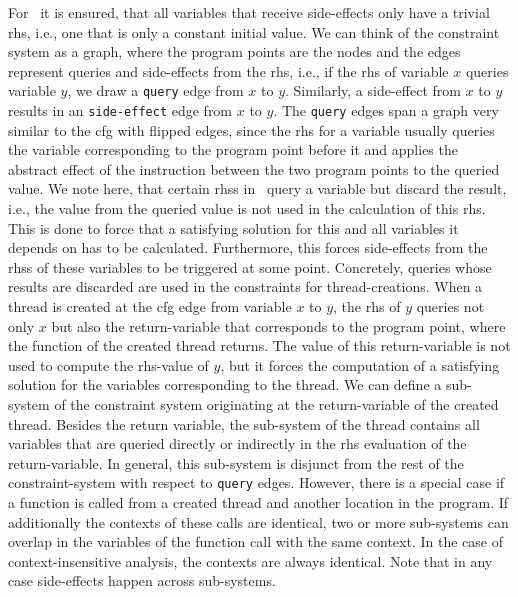   For \gob\ it is ensured, that all variables that receive side-effects only have a trivial \ac{rhs}, i.e., one that is only a constant initial value.
  We can think of the constraint system as a graph, where the program points are the nodes and the edges represent queries and side-effects from the \ac{rhs}, i.e., if the \ac{rhs} of variable $x$ queries variable $y$, we draw a \texttt{query} edge from $x$ to $y$. Similarly, a side-effect from $x$ to $y$ results in an \texttt{side-effect} edge from $x$ to $y$. The \texttt{query} edges span a graph very similar to the \ac{cfg} with flipped edges, since the \ac{rhs} for a variable usually queries the variable corresponding to the program point before it and applies the abstract effect of the instruction between the two program points to the queried value.
  We note here, that certain \acp{rhs} in \gob\ query a variable but discard the result, i.e., the value from the queried value is not used in the calculation of this \ac{rhs}. This is done to force that a satisfying solution for this and all variables it depends on has to be calculated. Furthermore, this forces side-effects from the \acp{rhs} of these variables to be triggered at some point. Concretely, queries whose results are discarded are used in the constraints for thread-creations. When a thread is created at the \ac{cfg} edge from variable $x$ to $y$, the \ac{rhs} of $y$ queries not only $x$ but also the return-variable that corresponds to the program point, where the function of the created thread returns. The value of this return-variable is not used to compute the \ac{rhs}-value of $y$, but it forces the computation of a satisfying solution for the variables corresponding to the thread.
  We can define a sub-system of the constraint system originating at the return-variable of the created thread. Besides the return variable, the sub-system of the thread contains all variables that are queried directly or indirectly in the \ac{rhs} evaluation of the return-variable. In general, this sub-system is disjunct from the rest of the constraint-system with respect to \texttt{query} edges. However, there is a special case if a function is called from a created thread and another location in the program. If additionally the contexts of these calls are identical, two or more sub-systems can overlap in the variables of the function call with the same context. In the case of context-insensitive analysis, the contexts are always identical. Note that in any case side-effects happen across sub-systems.


